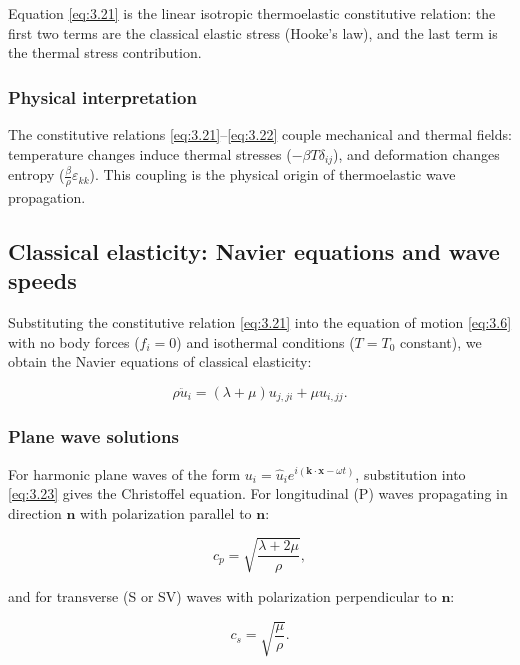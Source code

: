 Equation \eqref{eq:3.21} is the linear isotropic thermoelastic constitutive relation: the first two terms are the classical elastic stress (Hooke's law), and the last term is the thermal stress contribution.

\subsubsection{Physical interpretation}
The constitutive relations \eqref{eq:3.21}--\eqref{eq:3.22} couple mechanical and thermal fields: temperature changes induce thermal stresses ($-\beta T\delta_{ij}$), and deformation changes entropy ($\frac{\beta}{\rho}\varepsilon_{kk}$). This coupling is the physical origin of thermoelastic wave propagation.

\subsection{Classical elasticity: Navier equations and wave speeds}
\label{sec:3.6}

Substituting the constitutive relation \eqref{eq:3.21} into the equation of motion \eqref{eq:3.6} with no body forces ($f_i = 0$) and isothermal conditions ($T = T_0$ constant), we obtain the Navier equations of classical elasticity:

\begin{equation}
\rho\ddot{u}_i = (\lambda + \mu)u_{j,ji} + \mu u_{i,jj}.
\label{eq:3.23}
\end{equation}

\subsubsection{Plane wave solutions}

For harmonic plane waves of the form $u_i = \hat{u}_i e^{i(\bm{k}\cdot\bm{x} - \omega t)}$, substitution into \eqref{eq:3.23} gives the Christoffel equation. For longitudinal (P) waves propagating in direction $\bm{n}$ with polarization parallel to $\bm{n}$:

\begin{equation}
c_p = \sqrt{\frac{\lambda + 2\mu}{\rho}},
\label{eq:3.24}
\end{equation}

and for transverse (S or SV) waves with polarization perpendicular to $\bm{n}$:

\begin{equation}
c_s = \sqrt{\frac{\mu}{\rho}}.
\label{eq:3.25}
\end{equation}

